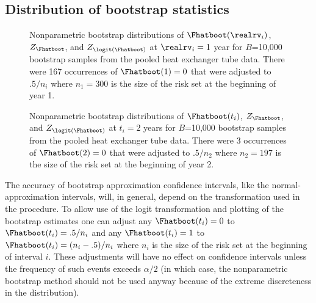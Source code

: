 \subsection{Distribution of bootstrap statistics}
\label{section:nonpar.boot.dist}
\begin{figure}
\caption{Nonparametric bootstrap distributions of 
$\Fhatboot(\realrv_{i})$, $Z_{\Fhatboot}$, and
$Z_{\logit(\Fhatboot)}$ at $\realrv_{i}=1$ year for $B$=10,000 bootstrap
samples from the pooled heat exchanger tube data.  There were 167 occurrences of
$\Fhatboot(1)=0$ that were adjusted to $.5/n_{i}$
where $n_{1}=300$ is the size of the risk set at the beginning of year 1.}
\label{figure:heatexch.cdfboot.t1.ps}
\end{figure}
\begin{figure}
\caption{Nonparametric bootstrap distributions of 
$\Fhatboot(t_{i})$, $Z_{\Fhatboot}$, and $Z_{\logit(\Fhatboot)}$ at
$t_{i}=2$ years for $B$=10,000 bootstrap samples from the pooled
heat exchanger tube data.  There were 3 occurrences of $\Fhatboot(2)=0$
that were adjusted to $.5/n_{2}$ where $n_{2}=197$ is the size of
the risk set at the beginning of year 2.}
\label{figure:heatexch.cdfboot.t2.ps}
\end{figure}

The accuracy of bootstrap approximation confidence intervals, like the
normal-approximation intervals, will, in general, depend on the
transformation used in the procedure.  To allow use of the logit
transformation and plotting of the bootstrap estimates one can adjust
any $\Fhatboot(t_{i})=0$ to $\Fhatboot(t_{i})=.5/n_{i}$ and any
$\Fhatboot(t_{i})=1$ to $\Fhatboot(t_{i})=(n_{i}-.5)/n_{i}$ where
$n_{i}$ is the size of the risk set at the beginning of interval $i$.
These adjustments will have no effect on confidence intervals unless
the frequency of such events exceeds $\alpha/2$ (in which case, the
nonparametric bootstrap method should not be used anyway because of
the extreme discreteness in the distribution).

